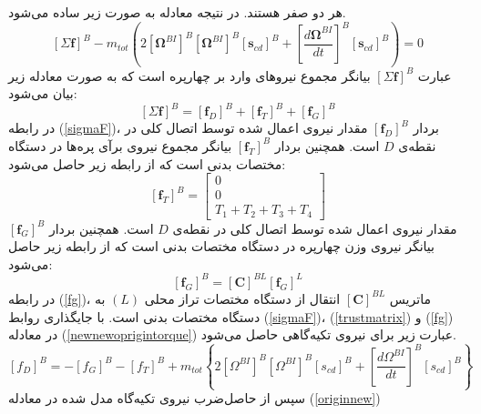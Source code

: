 هر دو صفر هستند. در نتیجه معادله به صورت زیر ساده می‌شود.
\begin{equation}\label{newnewoprigintorque}
	\left[\Sigma \boldsymbol f\right]^B - 
	m_{tot}\left(2
	\left[\boldsymbol\Omega^{BI}\right]^B
	\left[\boldsymbol\Omega^{BI}\right]^B
	\left[\boldsymbol s_{cd}\right]^B+
	\left[\dfrac{d\boldsymbol\Omega^{BI}}{dt}\right]^B
	\left[\boldsymbol s_{cd}\right]^B
	\right) = 0
\end{equation}
عبارت 
$\left[\Sigma \boldsymbol f\right]^B$
بیانگر مجموع نیروهای وارد بر چهارپره است که به صورت معادله زیر بیان می‌شود:
\begin{equation}\label{sigmaF}
	\left[\Sigma \boldsymbol f\right]^B = \left[\boldsymbol f_D\right]^B+\left[\boldsymbol f_T\right]^B+
	\left[\boldsymbol f_G\right]^B
\end{equation}
در رابطه 
(\ref{sigmaF})، بردار 
$\left[\boldsymbol f_D\right]^B$
مقدار نیروی اعمال‌ شده توسط اتصال کلی در نقطه‌ی
$D$
است. همچنین  بردار 
$\left[\boldsymbol f_T\right]^B$
بیانگر مجموع نیروی برآی پره‌ها در دستگاه مختصات بدنی است که از رابطه زیر حاصل می‌شود:
\begin{equation}\label{trustmatrix}
	\left[\boldsymbol f_T\right]^B = \begin{bmatrix}
		0\\0\\
		T_1+T_2+T_3+T_4
	\end{bmatrix}
\end{equation}
مقدار نیروی اعمال‌ شده توسط اتصال کلی در نقطه‌ی
$D$
است. همچنین  بردار 
$\left[\boldsymbol f_G\right]^B$
بیانگر نیروی وزن چهارپره در دستگاه مختصات بدنی است که از رابطه زیر حاصل می‌شود:
\begin{equation}\label{fg}
	\left[\boldsymbol f_G\right]^B = \left[\boldsymbol C\right]^{BL}
	\left[\boldsymbol f_G\right]^L
\end{equation}
در رابطه
(\ref{fg})،
ماتریس
$\left[\boldsymbol C\right]^{BL}$
 انتقال از دستگاه مختصات تراز محلی
$(L)$
 به دستگاه مختصات بدنی است. با جایگذاری روابط
(\ref{sigmaF})،
(\ref{trustmatrix}) و
(\ref{fg})
در معادله
(\ref{newnewoprigintorque})
عبارت زیر برای نیروی تكیه‌گاهی حاصل می‌شود.
\begin{equation}\label{originnew}
	\left[f_D\right]^B = 
	-\left[f_G\right]^B-
	\left[f_T\right]^B+
	m_{tot}\left\{2
	\left[\Omega^{BI}\right]^B
	\left[\Omega^{BI}\right]^B
	\left[s_{cd}\right]^B+
	\left[\dfrac{d\Omega^{BI}}{dt}\right]^B
	\left[s_{cd}\right]^B
	\right\}
\end{equation}
سپس از حاصل‌ضرب نیروی تكیه‌گاه مدل‌ شده در معادله
(\ref{originnew})
